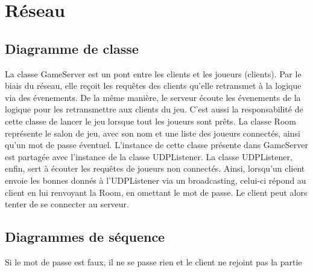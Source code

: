 \chapter{Réseau} \label{chapter:reseau}

    \section{Diagramme de classe}


        La classe GameServer est un pont entre les clients et les joueurs (clients).
        Par le biais du réseau, elle reçoit les requêtes des clients qu'elle
        retransmet à la logique via des évenements. De la même manière,
        le serveur écoute les évenements de la logique pour les retransmettre
        aux clients du jeu. C'est aussi la responsabilité de cette classe de
        lancer le jeu lorsque tout les joueurs sont prêts.
        \newline
        La classe Room représente le salon de jeu, avec son nom et une liste
        des joueurs connectés, ainsi qu'un mot de passe éventuel. L'instance
        de cette classe présente dans GameServer est partagée avec l'instance
        de la classe UDPListener.
        \newline
        La classe UDPListener, enfin, sert à écouter les requêtes de joueurs
        non connectés. Ainsi, lorsqu'un client envoie les bonnes donnés à
        l'UDPListener via un broadcasting, celui-ci répond au client en lui
        renvoyant la Room, en omettant le mot de passe. Le client peut alors
        tenter de se connecter au serveur.

    \section{Diagrammes de séquence}


        Si le mot de passe est faux, il ne se passe rien et le client ne rejoint pas la partie


